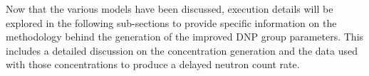 Now that the various models have been discussed, execution details will be explored in the following sub-sections to provide specific information on the methodology behind the generation of the improved \gls{DNP} group parameters.
This includes a detailed discussion on the concentration generation and the data used with those concentrations to produce a delayed neutron count rate.